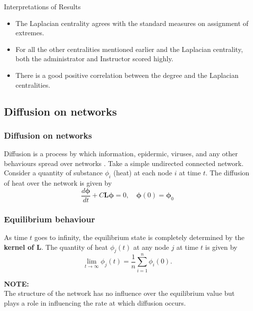 \documentclass{beamer}
\begin{document}
\begin{frame}{Interpretations of Results}
\begin{block}{}
\begin{itemize}
	\item The Laplacian centrality agrees with the standard measures on assignment of extremes.
	\vspace{0.5cm}
	\pause
	\item For all the other centralities mentioned earlier and the Laplacian centrality, both the administrator and Instructor scored highly.
	\vspace{0.5cm}
	\pause
	\item There is a good positive correlation between the degree and the Laplacian centralities.
\end{itemize}
\end{block}
\end{frame}

\subsection{Diffusion on networks}
\begin{frame}
	\frametitle{Diffusion on networks}
	
		Diffusion is a process by which information, epidermic, viruses, and any other behaviours spread over networks \cite{newman2010networks}.
    	Take a simple undirected connected network. Consider a quantity of substance $\phi_i$ (heat) at each node $i$ at time $t$. The diffusion of heat over the network is given by
    	\begin{equation}
    	\frac{d\boldsymbol{\phi}}{dt} + C\mathbf{L}\boldsymbol{\phi} = 0, \quad \boldsymbol{\phi}(0) = \boldsymbol{\phi}_0 
    	\label{heatequation}
    	\end{equation}
%    	  
\end{frame}

\begin{frame}
	\frametitle{Equilibrium behaviour}
 As time $t$ goes to infinity, the equilibrium state is completely determined by the \textbf{kernel of $\mathbf{L}$}. 
 The quantity of heat $\phi_j(t)$ at any node $j$ at time $t$ is given by
 \begin{equation*}
 \lim_{t \to \infty}\phi_j(t) = \frac{1}{n} \sum_{i = 1}^n \phi_i(0). 
 \end{equation*}
 
 \vspace{1cm}
 \textbf{NOTE:} \\
 The structure of the network has no influence over the equilibrium value but plays a role in influencing the rate at which diffusion occurs.
\end{frame}
\end{document}
